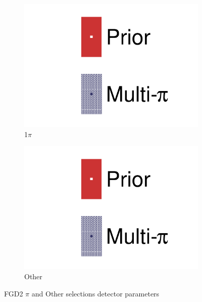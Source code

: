 \begin{figure}[h]
	\begin{subfigure}[t]{0.32\textwidth}
		\includegraphics[width=\textwidth,page=50, trim={0mm 0mm 0mm 0mm}, clip]{figures/mach3/2018/data/2018a_FixedCov_RedCov_Mpi_Data_merge_drawPar_withDet}
		\caption{1$\pi$}
	\end{subfigure}
	\begin{subfigure}[t]{0.32\textwidth}
		\includegraphics[width=\textwidth,page=51, trim={0mm 0mm 0mm 0mm}, clip]{figures/mach3/2018/data/2018a_FixedCov_RedCov_Mpi_Data_merge_drawPar_withDet}
		\caption{Other}
	\end{subfigure}
	\caption{FGD2 $\pi$ and Other selections detector parameters}
	\label{fig:data_multipi_det_fdg2_cc1piOth_nubar}
\end{figure}

